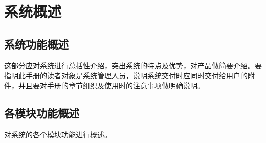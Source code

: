 \chapter{系统概述}

\section{系统功能概述}
这部分应对系统进行总括性介绍，突出系统的特点及优势，对产品做简要介绍。要指明此手册的读者对象是系统管理人员，说明系统交付时应同时交付给用户的附件，并且要对手册的章节组织及使用时的注意事项做明确说明。

\section{各模块功能概述}
对系统的各个模块功能进行概述。
